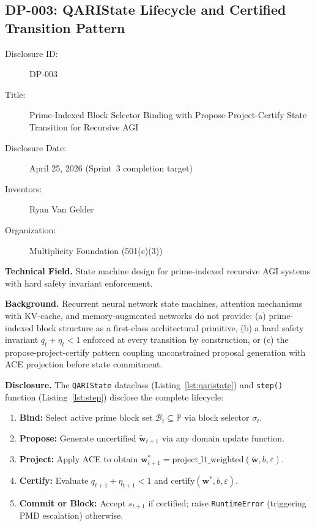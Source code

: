 \documentclass[12pt,letterpaper]{article}
\begin{document}
\subsection{DP-003: QARIState Lifecycle and Certified Transition Pattern}

\begin{description}
  \item[Disclosure ID:] DP-003
  \item[Title:] Prime-Indexed Block Selector Binding with
    Propose-Project-Certify State Transition for Recursive AGI
  \item[Disclosure Date:] April 25, 2026 (Sprint~3 completion target)
  \item[Inventors:] Ryan Van Gelder
  \item[Organization:] Multiplicity Foundation (501(c)(3))
\end{description}

\textbf{Technical Field.} State machine design for prime-indexed
recursive AGI systems with hard safety invariant enforcement.

\textbf{Background.} Recurrent neural network state machines, attention
mechanisms with KV-cache, and memory-augmented networks do not provide:
(a) prime-indexed block structure as a first-class architectural
primitive, (b) a hard safety invariant $q_t + \eta_t < 1$ enforced at
every transition by construction, or (c) the propose-project-certify
pattern coupling unconstrained proposal generation with ACE projection
before state commitment.

\textbf{Disclosure.} The \texttt{QARIState} dataclass
(Listing~\ref{lst:qaristate}) and \texttt{step()} function
(Listing~\ref{lst:step}) disclose the complete lifecycle:

\begin{enumerate}
  \item \textbf{Bind:} Select active prime block set $\mathcal{B}_t
        \subseteq \mathbb{P}$ via block selector $\sigma_t$.
  \item \textbf{Propose:} Generate uncertified $\tilde{\mathbf{w}}_{t+1}$
        via any domain update function.
  \item \textbf{Project:} Apply ACE to obtain
        $\mathbf{w}^*_{t+1} = \text{project\_l1\_weighted}(\tilde{\mathbf{w}},
        b, \varepsilon)$.
  \item \textbf{Certify:} Evaluate $q_{t+1} + \eta_{t+1} < 1$ and
        $\text{certify}(\mathbf{w}^*, b, \varepsilon)$.
  \item \textbf{Commit or Block:} Accept $s_{t+1}$ if certified;
        raise \texttt{RuntimeError} (triggering PMD escalation) otherwise.
\end{enumerate}
\end{document}
